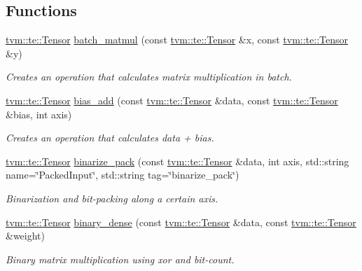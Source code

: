 \subsection*{Functions}
\begin{DoxyCompactItemize}
\item 
\hyperlink{classtvm_1_1te_1_1Tensor}{tvm\+::te\+::\+Tensor} \hyperlink{namespacetopi_1_1nn_a607b758a01a9350507e44670cecfbbb1}{batch\+\_\+matmul} (const \hyperlink{classtvm_1_1te_1_1Tensor}{tvm\+::te\+::\+Tensor} \&x, const \hyperlink{classtvm_1_1te_1_1Tensor}{tvm\+::te\+::\+Tensor} \&y)
\begin{DoxyCompactList}\small\item\em Creates an operation that calculates matrix multiplication in batch. \end{DoxyCompactList}\item 
\hyperlink{classtvm_1_1te_1_1Tensor}{tvm\+::te\+::\+Tensor} \hyperlink{namespacetopi_1_1nn_aff898fc8b6170d953782a01f6fc0e63f}{bias\+\_\+add} (const \hyperlink{classtvm_1_1te_1_1Tensor}{tvm\+::te\+::\+Tensor} \&data, const \hyperlink{classtvm_1_1te_1_1Tensor}{tvm\+::te\+::\+Tensor} \&bias, int axis)
\begin{DoxyCompactList}\small\item\em Creates an operation that calculates data + bias. \end{DoxyCompactList}\item 
\hyperlink{classtvm_1_1te_1_1Tensor}{tvm\+::te\+::\+Tensor} \hyperlink{namespacetopi_1_1nn_a01028bdee00ceef9f58fd29e4fceeaad}{binarize\+\_\+pack} (const \hyperlink{classtvm_1_1te_1_1Tensor}{tvm\+::te\+::\+Tensor} \&data, int axis, std\+::string name=\char`\"{}Packed\+Input\char`\"{}, std\+::string tag=\char`\"{}binarize\+\_\+pack\char`\"{})
\begin{DoxyCompactList}\small\item\em Binarization and bit-\/packing along a certain axis. \end{DoxyCompactList}\item 
\hyperlink{classtvm_1_1te_1_1Tensor}{tvm\+::te\+::\+Tensor} \hyperlink{namespacetopi_1_1nn_acedfa473f37183df3c8188b667bb7594}{binary\+\_\+dense} (const \hyperlink{classtvm_1_1te_1_1Tensor}{tvm\+::te\+::\+Tensor} \&data, const \hyperlink{classtvm_1_1te_1_1Tensor}{tvm\+::te\+::\+Tensor} \&weight)
\begin{DoxyCompactList}\small\item\em Binary matrix multiplication using xor and bit-\/count. \end{DoxyCompactList}\item 

\end{DoxyCompactItemize}

